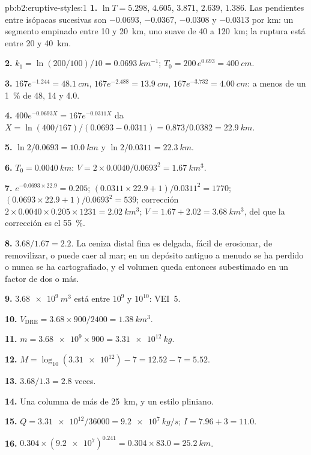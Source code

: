 \begin{solution}{pb:b2:eruptive-styles:1}
\textbf{1.} $\ln T = 5.298$, $4.605$, $3.871$, $2.639$, $1.386$. Las pendientes entre
isópacas sucesivas son $-0.0693$, $-0.0367$, $-0.0308$ y $-0.0313$ por km: un
segmento empinado entre 10 y \qty{20}{km}, uno suave de 40 a
\qty{120}{km}; la ruptura está entre 20 y \qty{40}{km}.

\textbf{2.} $k_1 = \ln(200/100)/10 = \qty{0.0693}{km^{-1}}$; $T_0 = 200\,e^{0.693} =
\qty{400}{cm}$.

\textbf{3.} $167e^{-1.244} = \qty{48.1}{cm}$, $167e^{-2.488} = \qty{13.9}{cm}$,
$167e^{-3.732} = \qty{4.00}{cm}$: a menos de un \qty{1}{\percent} de 48, 14 y 4.0.

\textbf{4.} $400e^{-0.0693X} = 167e^{-0.0311X}$ da $X = \ln(400/167)/(0.0693 -
0.0311) = 0.873/0.0382 = \qty{22.9}{km}$.

\textbf{5.} $\ln2/0.0693 = \qty{10.0}{km}$ y $\ln2/0.0311 = \qty{22.3}{km}$.

\textbf{6.} $T_0 = \qty{0.0040}{km}$: $V = 2\times0.0040/0.0693^2 =
\qty{1.67}{km^3}$.

\textbf{7.} $e^{-0.0693\times22.9} = 0.205$; $(0.0311\times22.9 + 1)/0.0311^2 = 1770$;
$(0.0693\times22.9 + 1)/0.0693^2 = 539$; corrección $2\times0.0040\times0.205\times1231 =
\qty{2.02}{km^3}$; $V = 1.67 + 2.02 = \qty{3.68}{km^3}$, del que la corrección es
el \qty{55}{\percent}.

\textbf{8.} $3.68/1.67 = 2.2$. La ceniza distal fina es delgada, fácil de erosionar,
de removilizar, o puede caer al mar; en un depósito antiguo a menudo se ha perdido o nunca se ha
cartografiado, y el volumen queda entonces subestimado en un factor de dos o más.

\textbf{9.} $\qty{3.68e9}{m^3}$ está entre $10^9$ y $10^{10}$: VEI~5.

\textbf{10.} $V_{\mathrm{DRE}} = 3.68\times900/2400 = \qty{1.38}{km^3}$.

\textbf{11.} $m = \num{3.68e9}\times900 = \qty{3.31e12}{kg}$.

\textbf{12.} $M = \log_{10}(\num{3.31e12}) - 7 = 12.52 - 7 = 5.52$.

\textbf{13.} $3.68/1.3 = 2.8$ veces.

\textbf{14.} Una columna de más de \qty{25}{km}, y un estilo pliniano.

\textbf{15.} $Q = \num{3.31e12}/36000 = \qty{9.2e7}{kg/s}$; $I = 7.96 + 3 = 11.0$.

\textbf{16.} $0.304\times(\num{9.2e7})^{0.241} = 0.304\times83.0 = \qty{25.2}{km}$.


\end{solution}
